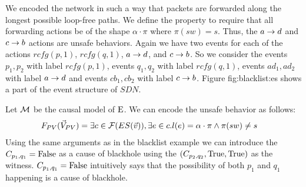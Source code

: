 \begin{example}
    We encoded the network in such a way that packets are forwarded
    along the longest possible loop-free paths.
    We define the property to require that all forwarding actions 
    be of the shape $\alpha\cdot\pi$ where $\pi(sw) = s$.
    Thus, the $a \rightarrow d$ and $c \rightarrow b$ actions are unsafe behaviors.
    Again we have two events for each of the actions
    $rcfg(p,1)$, $rcfg(q,1)$, $a \rightarrow d$, and $c \rightarrow b$.
    So we consider the events $p_1,p_2$ with label $rcfg(p,1)$,
    events $q_1,q_2$ with label $rcfg(q,1)$,
    events $ad_1,ad_2$ with label $a \rightarrow d$ and events $cb_1,cb_2$
    with label $c\rightarrow b$.
    Figure \refname{fig:blacklist:es} shows a part of the event
    structure of $SDN$.
    \begin{figure}
        \centering
        \caption{}
        \label{fig:blackhole:es}
    \end{figure}
    Let $\mathcal{M}$ be the causal model of $\mathrm{E}$.
    We can encode the unsafe behavior as follows:
    \begin{align*}
        F_{PV}(\vec V_{PV}) & = \exists c \in \mathcal{F}(ES(\vec v)),
        \exists e \in c. l(e) =  \alpha\cdot\pi \wedge \pi(sw) \neq s
    \end{align*}
    Using the same arguments as in the blacklist example we can 
    introduce the $C_{p_1,q_1} = \mathrm{False}$ as a cause of blackhole 
    using the $(C_{p_2,q_2},\mathrm{True},\mathrm{True})$ as the witness.
    $C_{p_1,q_1} = \mathrm{False}$ intuitively says that the possibility of
    both $p_1$ and $q_1$ happening is a cause of blackhole.
\end{example}